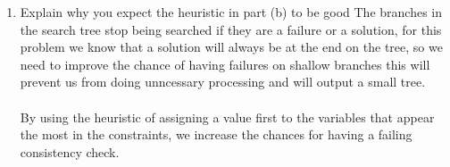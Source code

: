 \documentclass{article}
\def\ans#1{{\color{ans}#1}}
\begin{document}
\begin{enumerate}[label=(\alph*)]
    \item Explain why you expect the heuristic in part (b) to be good
    \ans{
        The branches in the search tree stop being searched if they are a failure or a solution, for this 
        problem we know that a solution will always be at the end on the tree, so we need to improve the 
        chance of having failures on shallow branches this will prevent us from doing unncessary processing 
        and will output a small tree. \\ \\
        By using the heuristic of assigning a value first to the variables that appear the most in 
        the constraints, we increase the chances for having a failing consistency check.
    }
\end{enumerate}

\clearpage
\end{document}
